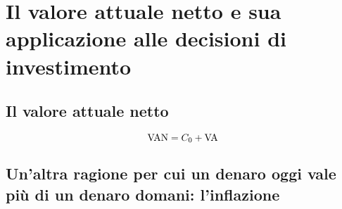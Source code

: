 \chapter{Il valore attuale netto e sua applicazione alle decisioni di investimento}
\label{chap:VAN}

\section{Il valore attuale netto}
\label{sec:VAN}
\begin{equation}
  \label{eq:VAN}
  \mathrm{VAN} = C_0+\mathrm{VA}
\end{equation}



\section[L'inflazione]{Un'altra ragione per cui un denaro oggi vale più di un denaro domani: l'inflazione}
\label{sec:Infl}



